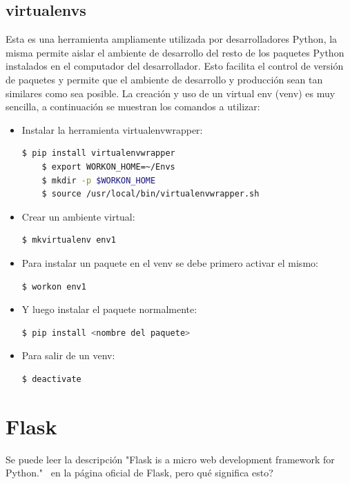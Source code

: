 \subsection{virtualenvs}

Esta es una herramienta ampliamente utilizada por desarrolladores Python, la misma permite aislar el ambiente de desarrollo del resto de los paquetes Python instalados en el computador del desarrollador. Esto facilita el control de versión de paquetes y permite que el ambiente de desarrollo y producción sean tan similares como sea posible. 
La creación y uso de un virtual env (venv) es muy sencilla, a continuación se muestran los comandos a utilizar:

\begin{itemize}
\item Instalar la herramienta virtualenvwrapper:
\begin{lstlisting}[language=bash]
  	$ pip install virtualenvwrapper
	$ export WORKON_HOME=~/Envs
	$ mkdir -p $WORKON_HOME
	$ source /usr/local/bin/virtualenvwrapper.sh
\end{lstlisting}	

\item Crear un ambiente virtual:
\begin{lstlisting}[language=bash]
  $ mkvirtualenv env1
\end{lstlisting}
	
\item Para instalar un paquete en el venv se debe primero activar el mismo:
\begin{lstlisting}[language=bash]
  $ workon env1
\end{lstlisting}
	
\item Y luego instalar el paquete normalmente:
\begin{lstlisting}[language=bash]
  $ pip install <nombre del paquete>
\end{lstlisting}

\item Para salir de un venv:
\begin{lstlisting}[language=bash]
  $ deactivate
\end{lstlisting}

\end{itemize}

\section{Flask}
Se puede leer la descripción "Flask is a micro web development framework for Python."~\cite{FlaskDocs} en la página oficial de Flask, pero qué significa esto?

